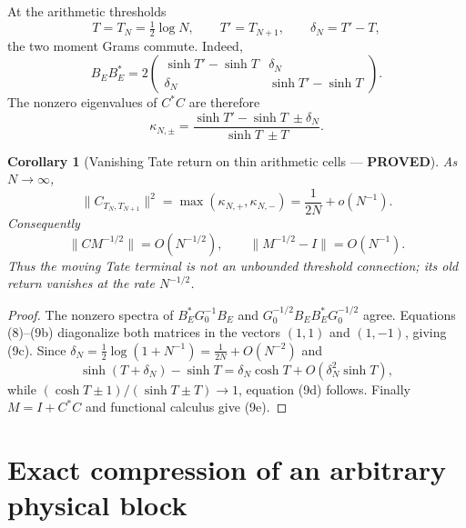 \documentclass[11pt]{article}
\newcommand{\PROVED}{\textcolor{green!40!black}{\textbf{PROVED}}}
\newtheorem{corollary}{Corollary}
\begin{document}
At the arithmetic thresholds
\begin{equation}
 T=T_N=\tfrac12\log N,
 \qquad T'=T_{N+1},
 \qquad \delta_N=T'-T,                                      \tag{9a}
\end{equation}
the two moment Grams commute.  Indeed,
\begin{equation}
 B_EB_E^*=2
 \begin{pmatrix}
  \sinh T'-\sinh T&\delta_N\\
  \delta_N&\sinh T'-\sinh T
 \end{pmatrix}.                                             \tag{9b}
\end{equation}
The nonzero eigenvalues of $C^*C$ are therefore
\begin{equation}
 \kappa_{N,\pm}=
 \frac{\sinh T'-\sinh T\ \pm\delta_N}
      {\sinh T\ \pm T}.                                    \tag{9c}
\end{equation}

\begin{corollary}[Vanishing Tate return on thin arithmetic cells ---
\PROVED]
As $N\to\infty$,
\begin{equation}
 \|C_{T_N,T_{N+1}}\|^2
 =\max(\kappa_{N,+},\kappa_{N,-})
 =\frac1{2N}+o(N^{-1}).                                     \tag{9d}
\end{equation}
Consequently
\begin{equation}
 \|CM^{-1/2}\|=O(N^{-1/2}),
 \qquad \|M^{-1/2}-I\|=O(N^{-1}).                           \tag{9e}
\end{equation}
Thus the moving Tate terminal is not an unbounded threshold connection;
its old return vanishes at the rate $N^{-1/2}$.
\end{corollary}

\begin{proof}
The nonzero spectra of $B_E^*G_0^{-1}B_E$ and
$G_0^{-1/2}B_EB_E^*G_0^{-1/2}$ agree.  Equations (8)--(9b) diagonalize
both matrices in the vectors $(1,1)$ and $(1,-1)$, giving (9c).  Since
$\delta_N=\frac12\log(1+N^{-1})=\frac1{2N}+O(N^{-2})$ and
\[
 \sinh(T+\delta_N)-\sinh T
 =\delta_N\cosh T+O(\delta_N^2\sinh T),
\]
while $(\cosh T\pm1)/(\sinh T\pm T)\to1$, equation (9d) follows.
Finally $M=I+C^*C$ and functional calculus give (9e).
\end{proof}

\section{Exact compression of an arbitrary physical block}
\end{document}
